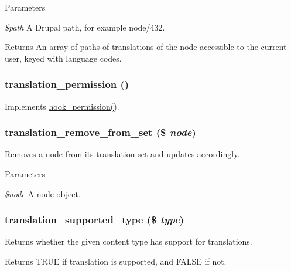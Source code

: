 \begin{DoxyParams}{Parameters}
\item[{\em \$path}]A Drupal path, for example node/432.\end{DoxyParams}
\begin{DoxyReturn}{Returns}
An array of paths of translations of the node accessible to the current user, keyed with language codes. 
\end{DoxyReturn}
\hypertarget{translation_8module_a45f21da871a0b08fecaa736de409db16}{
\subsubsection[{translation\_\-permission}]{\setlength{\rightskip}{0pt plus 5cm}translation\_\-permission ()}}
\label{translation_8module_a45f21da871a0b08fecaa736de409db16}
Implements \hyperlink{group__hooks_ga2b22b45f4925f2478412477bae329713}{hook\_\-permission()}. \hypertarget{translation_8module_ab01d39380356f99eee6f5ad5a30a07a4}{
\subsubsection[{translation\_\-remove\_\-from\_\-set}]{\setlength{\rightskip}{0pt plus 5cm}translation\_\-remove\_\-from\_\-set (\$ {\em node})}}
\label{translation_8module_ab01d39380356f99eee6f5ad5a30a07a4}
Removes a node from its translation set and updates accordingly.


\begin{DoxyParams}{Parameters}
\item[{\em \$node}]A node object. \end{DoxyParams}
\hypertarget{translation_8module_ad7a4f3a66afd7b392ae2c1ebd5854d7f}{
\subsubsection[{translation\_\-supported\_\-type}]{\setlength{\rightskip}{0pt plus 5cm}translation\_\-supported\_\-type (\$ {\em type})}}
\label{translation_8module_ad7a4f3a66afd7b392ae2c1ebd5854d7f}
Returns whether the given content type has support for translations.

\begin{DoxyReturn}{Returns}
TRUE if translation is supported, and FALSE if not. 
\end{DoxyReturn}
